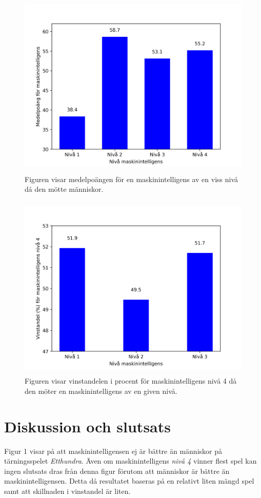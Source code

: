 \documentclass[12pt,a4paper]{article}
\begin{document}
    
    \begin{figure}[H]
      \centering
      \includegraphics[height=3.5in]{./images/medelpoang_maskinintelligens.png}
      \caption{Figuren visar medelpoängen för en maskinintelligens av en viss
      nivå då den mötte människor.}\label{fig:medelpoangmaskinintelligens}
    \end{figure}

    
    \begin{figure}[H]
      \centering
      \includegraphics[height=3.5in]{./images/vinstandel_niva4.png} \caption{Figuren visar vinstandelen i procent för maskinintelligens nivå 4 då den möter en maskinintelligens av en given nivå.}\label{fig:vinstandelniva4}
    \end{figure}


  \section{Diskussion och slutsats}\label{sec:diskussionochslutsats}
  Figur 1 visar på att maskinintelligensen ej är bättre än människor på tärningsspelet \emph{Etthundra}. Även om maskinintelligens \emph{nivå 4} vinner flest spel kan ingen slutsats dras från denna figur förutom att människor är bättre än maskinintelligensen. Detta då resultatet baseras på en relativt liten mängd spel samt att skillnaden i vinstandel är liten. 
  
\end{document}
